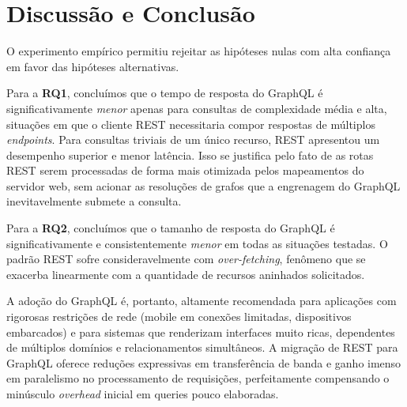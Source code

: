 \documentclass[12pt,a4paper]{article}
\begin{document}
\section{Discussão e Conclusão}

O experimento empírico permitiu rejeitar as hipóteses nulas com alta confiança em favor das hipóteses alternativas. 

Para a \textbf{RQ1}, concluímos que o tempo de resposta do GraphQL é significativamente \textit{menor} apenas para consultas de complexidade média e alta, situações em que o cliente REST necessitaria compor respostas de múltiplos \textit{endpoints}. Para consultas triviais de um único recurso, REST apresentou um desempenho superior e menor latência. Isso se justifica pelo fato de as rotas REST serem processadas de forma mais otimizada pelos mapeamentos do servidor web, sem acionar as resoluções de grafos que a engrenagem do GraphQL inevitavelmente submete a consulta.

Para a \textbf{RQ2}, concluímos que o tamanho de resposta do GraphQL é significativamente e consistentemente \textit{menor} em todas as situações testadas. O padrão REST sofre consideravelmente com \textit{over-fetching}, fenômeno que se exacerba linearmente com a quantidade de recursos aninhados solicitados.

A adoção do GraphQL é, portanto, altamente recomendada para aplicações com rigorosas restrições de rede (mobile em conexões limitadas, dispositivos embarcados) e para sistemas que renderizam interfaces muito ricas, dependentes de múltiplos domínios e relacionamentos simultâneos. A migração de REST para GraphQL oferece reduções expressivas em transferência de banda e ganho imenso em paralelismo no processamento de requisições, perfeitamente compensando o minúsculo \textit{overhead} inicial em queries pouco elaboradas.
\end{document}
